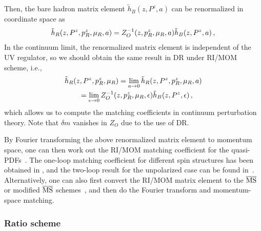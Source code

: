 Then, the bare hadron matrix element $\tilde{h}_B(z,P^z,a)$ can be renormalized in coordinate space as
\begin{align} \label{eq:rimomh}
	\tilde{h}_R(z,P^z, p_{\tiny R}^z,\mu_{\tiny R},a)=Z^{-1}_{O}(z,p_{\tiny R}^z,\mu_{\tiny R},a)\tilde{h}_B(z,P^z,a) \,,
\end{align}
In the continuum limit, the renormalized matrix element is independent of the UV regulator, so we should obtain the same result in DR under RI/MOM scheme, i.e.,
\begin{align}\label{eq:continuum}
	&\tilde{h}_R(z,P^z, p_{\tiny R}^z,\mu_{\tiny R})=\lim_{a\to0}\tilde{h}_R(z,P^z, p_{\tiny R}^z,\mu_{\tiny R},a) \nonumber\\
	&\qquad = \lim_{\epsilon\to0}Z^{-1}_{O}(z,p_{\tiny R}^z,\mu_{\tiny R},\epsilon)\tilde{h}_B(z,P^z,\epsilon)\,,
\end{align}
which allows us to compute the matching coefficients in continuum perturbation theory. Note that $\delta m$ vanishes in $Z_{O}$ due to the use of DR.

By Fourier transforming the above renormalized matrix element to momentum space, one can then work out the RI/MOM matching coefficient for the quasi-PDFs~\cite{Stewart:2017tvs}. The one-loop matching coefficient for different spin structures has been obtained in \cite{Stewart:2017tvs,Liu:2018uuj,Liu:2018hxv}, and the two-loop result for the unpolarized case can be found in~\cite{Chen:2020ody}. Alternatively, one can also first convert the RI/MOM matrix element to the ${\overline{\rm MS}}$ or modified ${\overline{\rm MS}}$ schemes~\cite{Constantinou:2017sej,Alexandrou:2019lfo}, and then do the Fourier transform and momentum-space matching.

\subsubsection{Ratio scheme}
\label{sec:renorm-npr-ratio}

